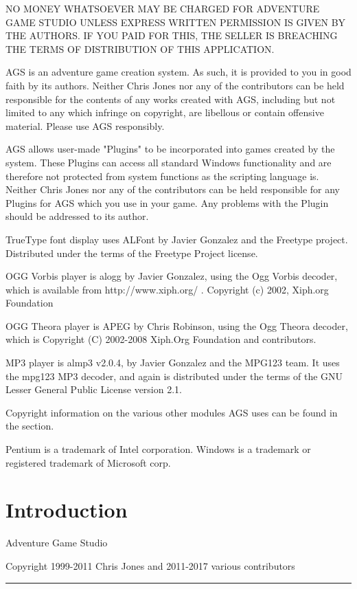 NO MONEY WHATSOEVER MAY BE CHARGED FOR ADVENTURE GAME STUDIO UNLESS EXPRESS
WRITTEN PERMISSION IS GIVEN BY THE AUTHORS. IF YOU PAID FOR THIS, THE SELLER
IS BREACHING THE TERMS OF DISTRIBUTION OF THIS APPLICATION.

AGS is an adventure game creation system. As such, it is provided to you in good faith by its authors. Neither Chris Jones nor any of the contributors can be held responsible for the contents of any works created with AGS, including but not limited to any which infringe on copyright, are libellous or contain offensive material. Please use AGS responsibly.

AGS allows user-made "Plugins" to be incorporated into games created by the system. These Plugins can access all standard Windows functionality and are therefore not protected from system functions as the scripting language is. Neither Chris Jones nor any of the contributors can be held responsible for any Plugins for AGS which you use in your game. Any problems with the Plugin should be addressed to its author.

TrueType font display uses ALFont by Javier Gonzalez and the Freetype project. Distributed
under the terms of the Freetype Project license.

OGG Vorbis player is alogg by Javier Gonzalez, using the Ogg Vorbis decoder, which is available
from http://www.xiph.org/ .  Copyright (c) 2002, Xiph.org Foundation

OGG Theora player is APEG by Chris Robinson, using the Ogg Theora decoder, which is
Copyright (C) 2002-2008 Xiph.Org Foundation and contributors.

MP3 player is almp3 v2.0.4, by Javier Gonzalez and the MPG123 team. It uses the mpg123 MP3 decoder,
and again is distributed under the terms of the GNU Lesser General Public License version 2.1.

Copyright information on the various other modules AGS uses can be found in the
 section.

Pentium is a trademark of Intel corporation.
Windows is a trademark or registered trademark of Microsoft corp.

\chapter{Introduction}%

\Large{Adventure Game Studio}

\large{Copyright 1999-2011 Chris Jones and 2011-2017 various contributors}\hrule

